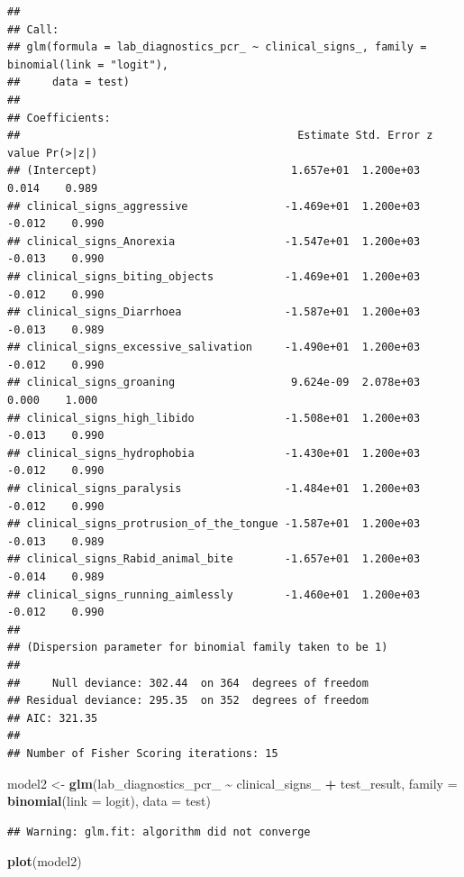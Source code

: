 \documentclass[
]{article}
\newenvironment{Shaded}{\begin{snugshade}}{\end{snugshade}}
\newcommand{\AttributeTok}[1]{\textcolor[rgb]{0.13,0.29,0.53}{#1}}
\newcommand{\FunctionTok}[1]{\textcolor[rgb]{0.13,0.29,0.53}{\textbf{#1}}}
\newcommand{\NormalTok}[1]{#1}
\newcommand{\OtherTok}[1]{\textcolor[rgb]{0.56,0.35,0.01}{#1}}
\newcommand{\SpecialCharTok}[1]{\textcolor[rgb]{0.81,0.36,0.00}{\textbf{#1}}}
\newcommand{\StringTok}[1]{\textcolor[rgb]{0.31,0.60,0.02}{#1}}
\begin{document}
\begin{verbatim}
## 
## Call:
## glm(formula = lab_diagnostics_pcr_ ~ clinical_signs_, family = binomial(link = "logit"), 
##     data = test)
## 
## Coefficients:
##                                           Estimate Std. Error z value Pr(>|z|)
## (Intercept)                              1.657e+01  1.200e+03   0.014    0.989
## clinical_signs_aggressive               -1.469e+01  1.200e+03  -0.012    0.990
## clinical_signs_Anorexia                 -1.547e+01  1.200e+03  -0.013    0.990
## clinical_signs_biting_objects           -1.469e+01  1.200e+03  -0.012    0.990
## clinical_signs_Diarrhoea                -1.587e+01  1.200e+03  -0.013    0.989
## clinical_signs_excessive_salivation     -1.490e+01  1.200e+03  -0.012    0.990
## clinical_signs_groaning                  9.624e-09  2.078e+03   0.000    1.000
## clinical_signs_high_libido              -1.508e+01  1.200e+03  -0.013    0.990
## clinical_signs_hydrophobia              -1.430e+01  1.200e+03  -0.012    0.990
## clinical_signs_paralysis                -1.484e+01  1.200e+03  -0.012    0.990
## clinical_signs_protrusion_of_the_tongue -1.587e+01  1.200e+03  -0.013    0.989
## clinical_signs_Rabid_animal_bite        -1.657e+01  1.200e+03  -0.014    0.989
## clinical_signs_running_aimlessly        -1.460e+01  1.200e+03  -0.012    0.990
## 
## (Dispersion parameter for binomial family taken to be 1)
## 
##     Null deviance: 302.44  on 364  degrees of freedom
## Residual deviance: 295.35  on 352  degrees of freedom
## AIC: 321.35
## 
## Number of Fisher Scoring iterations: 15
\end{verbatim}

\begin{Shaded}
\begin{Highlighting}[]
\NormalTok{model2 }\OtherTok{\textless{}{-}} \FunctionTok{glm}\NormalTok{(lab\_diagnostics\_pcr\_ }\SpecialCharTok{\textasciitilde{}}\NormalTok{ clinical\_signs\_ }\SpecialCharTok{+}\NormalTok{ test\_result, }\AttributeTok{family =} \FunctionTok{binomial}\NormalTok{(}\AttributeTok{link =} \StringTok{\textquotesingle{}logit\textquotesingle{}}\NormalTok{), }\AttributeTok{data =}\NormalTok{ test)}
\end{Highlighting}
\end{Shaded}

\begin{verbatim}
## Warning: glm.fit: algorithm did not converge
\end{verbatim}

\begin{Shaded}
\begin{Highlighting}[]
\FunctionTok{plot}\NormalTok{(model2)}
\end{Highlighting}
\end{Shaded}
\end{document}
